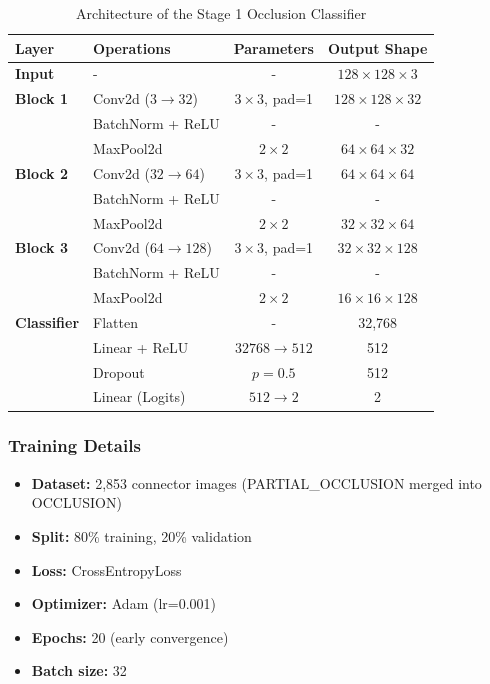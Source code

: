 \documentclass[11pt,a4paper,draft]{article}
\begin{document}
\begin{table}[H]
\centering
\small
\begin{tabular}{llcc}
\toprule
\textbf{Layer} & \textbf{Operations} & \textbf{Parameters} & \textbf{Output Shape} \\
\midrule
\textbf{Input} & - & - & $128 \times 128 \times 3$ \\
\midrule
\textbf{Block 1} & Conv2d ($3 \to 32$) & $3 \times 3$, pad=1 & $128 \times 128 \times 32$ \\
& BatchNorm + ReLU & - & - \\
& MaxPool2d & $2 \times 2$ & $64 \times 64 \times 32$ \\
\midrule
\textbf{Block 2} & Conv2d ($32 \to 64$) & $3 \times 3$, pad=1 & $64 \times 64 \times 64$ \\
& BatchNorm + ReLU & - & - \\
& MaxPool2d & $2 \times 2$ & $32 \times 32 \times 64$ \\
\midrule
\textbf{Block 3} & Conv2d ($64 \to 128$) & $3 \times 3$, pad=1 & $32 \times 32 \times 128$ \\
& BatchNorm + ReLU & - & - \\
& MaxPool2d & $2 \times 2$ & $16 \times 16 \times 128$ \\
\midrule
\textbf{Classifier} & Flatten & - & 32,768 \\
& Linear + ReLU & $32768 \to 512$ & 512 \\
& Dropout & $p=0.5$ & 512 \\
& Linear (Logits) & $512 \to 2$ & 2 \\
\bottomrule
\end{tabular}
\caption{Architecture of the Stage 1 Occlusion Classifier}
\label{tab:cnn_arch}
\end{table}
\subsubsection{Training Details}

\begin{itemize}
    \item \textbf{Dataset:} 2,853 connector images (PARTIAL\_OCCLUSION merged into OCCLUSION)
    \item \textbf{Split:} 80\% training, 20\% validation
    \item \textbf{Loss:} CrossEntropyLoss
    \item \textbf{Optimizer:} Adam (lr=0.001)
    \item \textbf{Epochs:} 20 (early convergence)
    \item \textbf{Batch size:} 32
\end{itemize}
\end{document}
